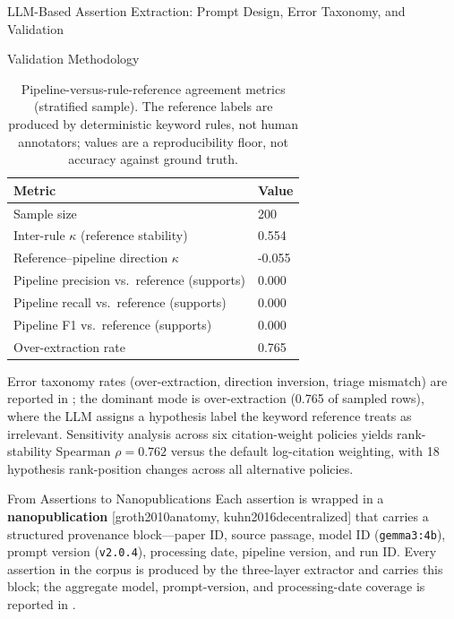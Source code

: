 \documentclass[
  ignorenonframetext,
]{beamer}
\providecommand{\citep}[1]{[#1]}
\begin{document}
\begin{frame}{LLM-Based Assertion Extraction:
Prompt Design, Error Taxonomy, and Validation
\label{sec:extraction_pipeline}}
\begin{block}{Validation Methodology}
\begin{table}[htbp]
\centering
\caption{Pipeline-versus-rule-reference agreement metrics (stratified sample). The reference labels are produced by deterministic keyword rules, not human annotators; values are a reproducibility floor, not accuracy against ground truth.}
\label{tab:validation_metrics}
\begin{tabular}{ll}
\toprule
\textbf{Metric} & \textbf{Value} \\
\midrule
Sample size & 200 \\
Inter-rule $\kappa$ (reference stability) & 0.554 \\
Reference--pipeline direction $\kappa$ & -0.055 \\
Pipeline precision vs.\ reference (supports) & 0.000 \\
Pipeline recall vs.\ reference (supports) & 0.000 \\
Pipeline F1 vs.\ reference (supports) & 0.000 \\
Over-extraction rate & 0.765 \\
\bottomrule
\end{tabular}
\end{table}

Error taxonomy rates (over-extraction, direction inversion, triage
mismatch) are reported in
; the dominant mode is
over-extraction (0.765 of sampled rows), where the LLM assigns a
hypothesis label the keyword reference treats as irrelevant. Sensitivity
analysis across six citation-weight policies yields rank-stability
Spearman \(\rho = 0.762\) versus the default log-citation weighting,
with 18 hypothesis rank-position changes across all alternative
policies.
\end{block}

\begin{block}{From Assertions to Nanopublications}
\protect{}\label{from-assertions-to-nanopublications}
Each assertion is wrapped in a \textbf{nanopublication}
\citep{groth2010anatomy, kuhn2016decentralized} that carries a
structured provenance block---paper ID, source passage, model ID
(\texttt{gemma3:4b}), prompt version (\texttt{v2.0.4}), processing date,
pipeline version, and run ID. Every assertion in the corpus is produced
by the three-layer extractor and carries this block; the aggregate
model, prompt-version, and processing-date coverage is reported in
.


\end{block}
\end{frame}
\end{document}
